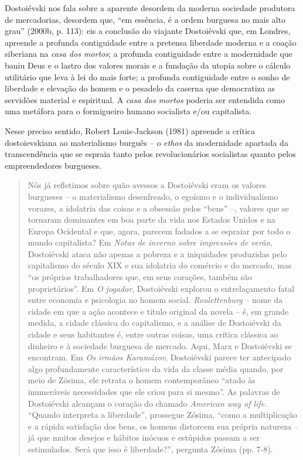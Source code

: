 Dostoiévski nos fala sobre a aparente desordem da moderna sociedade
produtora de mercadorias, desordem que, ``em essência, é a ordem
burguesa no mais alto grau'' (2000b, p. 113): eis a conclusão do
viajante Dostoiévski que, em Londres, apreende a profunda contiguidade
entre a pretensa liberdade moderna e a coação siberiana na \emph{casa
dos mortos}; a profunda contiguidade entre a modernidade que baniu Deus
e o lastro dos valores morais e a fundação da utopia sobre o cálculo
utilitário que leva à lei do mais forte; a profunda contiguidade entre o
sonho de liberdade e elevação do homem e o pesadelo da caserna que
democratiza as servidões material e espiritual. A \emph{casa dos mortos}
poderia ser entendida como uma metáfora para o formigueiro humano
socialista e/ou capitalista.

Nesse preciso sentido, Robert Louis-Jackson (1981) apreende a crítica
dostoievskiana ao materialismo burguês -- o \emph{ethos} da modernidade
apartada da transcendência que se espraia tanto pelos revolucionários
socialistas quanto pelos empreendedores burgueses.

\begin{quote}
Nós já refletimos sobre quão avessos a Dostoiévski eram os valores
burgueses -- o materialismo desenfreado, o egoísmo e o individualismo
vorazes, a idolatria das coisas e a obsessão pelos ``bens'' --, valores
que se tornaram dominantes em boa parte da vida nos Estados Unidos e na
Europa Ocidental e que, agora, parecem fadados a se espraiar por todo o
mundo capitalista? Em \emph{Notas de inverno sobre impressões de verão},
Dostoiévski ataca não apenas a pobreza e a iniquidades produzidas pelo
capitalismo do século XIX e sua idolatria do comércio e do mercado, mas
``os próprios trabalhadores que, em seus corações, também são
proprietários''. Em \emph{O jogador}, Dostoiévski explorou o
entrelaçamento fatal entre economia e psicologia no homem social.
\emph{Roulettenburg} -- nome da cidade em que a ação acontece e título
original da novela -- é, em grande medida, a cidade clássica do
capitalismo, e a análise de Dostoiévski da cidade e seus habitantes é,
entre outras coisas, uma crítica clássica ao dinheiro e à sociedade
burguesa de mercado. Aqui, Marx e Dostoiévski se encontram. Em \emph{Os
irmãos Karamázov}, Dostoiévski parece ter antecipado algo profundamente
característico da vida da classe média quando, por meio de Zósima, ele
retrata o homem contemporâneo ``atado às inumeráveis necessidades que
ele criou para si mesmo''. As palavras de Dostoiévski alcançam o coração
do chamado \emph{American way of life.} ``Quando interpreta a
liberdade'', prossegue Zósima, ``como a multiplicação e a rápida
satisfação dos bens, os homens distorcem sua própria natureza -- já que
muitos desejos e hábitos inócuos e estúpidos passam a ser estimulados.
Será que isso é liberdade?'', pergunta Zósima (pp. 7-8).
\end{quote}

